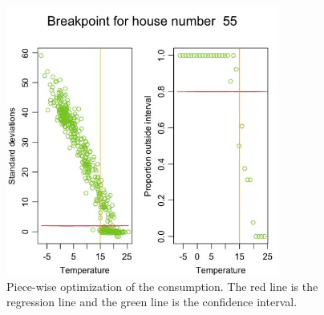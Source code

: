 \begin{figure}
    \centering
    \includegraphics[width=0.8\textwidth]{../../../figures/Breakpoint.jpeg}
    \caption{Piece-wise optimization of the consumption. The red line is the regression line and the green line is the confidence interval.}
    \label{fig: Consumption-PW}
\end{figure}



